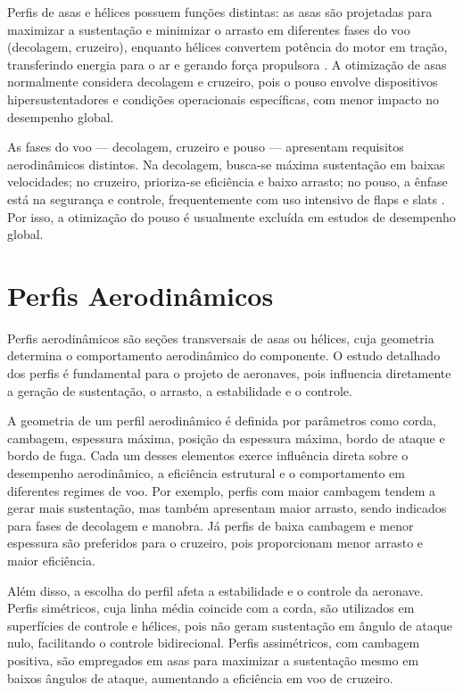 Perfis de asas e hélices possuem funções distintas: as asas são projetadas para maximizar a sustentação e minimizar o arrasto em diferentes fases do voo (decolagem, cruzeiro), enquanto hélices convertem potência do motor em tração, transferindo energia para o ar e gerando força propulsora \cite{anderson2017fundamentals}. A otimização de asas normalmente considera decolagem e cruzeiro, pois o pouso envolve dispositivos hipersustentadores e condições operacionais específicas, com menor impacto no desempenho global.

As fases do voo — decolagem, cruzeiro e pouso — apresentam requisitos aerodinâmicos distintos. Na decolagem, busca-se máxima sustentação em baixas velocidades; no cruzeiro, prioriza-se eficiência e baixo arrasto; no pouso, a ênfase está na segurança e controle, frequentemente com uso intensivo de flaps e slats \cite{raymer2018aircraft}. Por isso, a otimização do pouso é usualmente excluída em estudos de desempenho global.

\section{Perfis Aerodinâmicos}
Perfis aerodinâmicos são seções transversais de asas ou hélices, cuja geometria determina o comportamento aerodinâmico do componente. O estudo detalhado dos perfis é fundamental para o projeto de aeronaves, pois influencia diretamente a geração de sustentação, o arrasto, a estabilidade e o controle.

A geometria de um perfil aerodinâmico é definida por parâmetros como corda, cambagem, espessura máxima, posição da espessura máxima, bordo de ataque e bordo de fuga. Cada um desses elementos exerce influência direta sobre o desempenho aerodinâmico, a eficiência estrutural e o comportamento em diferentes regimes de voo. Por exemplo, perfis com maior cambagem tendem a gerar mais sustentação, mas também apresentam maior arrasto, sendo indicados para fases de decolagem e manobra. Já perfis de baixa cambagem e menor espessura são preferidos para o cruzeiro, pois proporcionam menor arrasto e maior eficiência.

Além disso, a escolha do perfil afeta a estabilidade e o controle da aeronave. Perfis simétricos, cuja linha média coincide com a corda, são utilizados em superfícies de controle e hélices, pois não geram sustentação em ângulo de ataque nulo, facilitando o controle bidirecional. Perfis assimétricos, com cambagem positiva, são empregados em asas para maximizar a sustentação mesmo em baixos ângulos de ataque, aumentando a eficiência em voo de cruzeiro.

